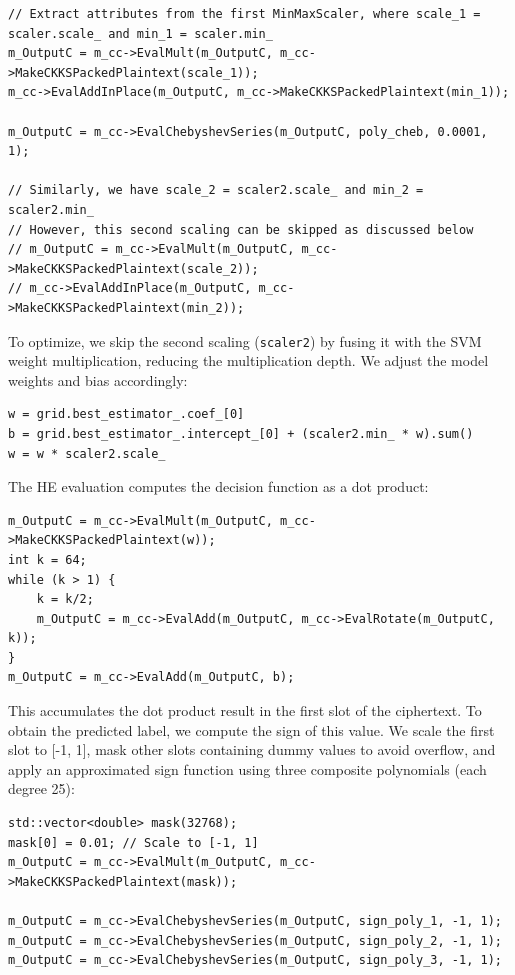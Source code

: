 \documentclass[article]{iacrtrans}
\begin{document}
\begin{lstlisting}
// Extract attributes from the first MinMaxScaler, where scale_1 = scaler.scale_ and min_1 = scaler.min_
m_OutputC = m_cc->EvalMult(m_OutputC, m_cc->MakeCKKSPackedPlaintext(scale_1));
m_cc->EvalAddInPlace(m_OutputC, m_cc->MakeCKKSPackedPlaintext(min_1));
    
m_OutputC = m_cc->EvalChebyshevSeries(m_OutputC, poly_cheb, 0.0001, 1);
    
// Similarly, we have scale_2 = scaler2.scale_ and min_2 = scaler2.min_
// However, this second scaling can be skipped as discussed below
// m_OutputC = m_cc->EvalMult(m_OutputC, m_cc->MakeCKKSPackedPlaintext(scale_2));
// m_cc->EvalAddInPlace(m_OutputC, m_cc->MakeCKKSPackedPlaintext(min_2));
\end{lstlisting}

To optimize, we skip the second scaling (\texttt{scaler2}) by fusing it with the SVM weight multiplication, reducing the multiplication depth. We adjust the model weights and bias accordingly:

\begin{lstlisting}
w = grid.best_estimator_.coef_[0]
b = grid.best_estimator_.intercept_[0] + (scaler2.min_ * w).sum()
w = w * scaler2.scale_
\end{lstlisting}

The HE evaluation computes the decision function as a dot product:

\begin{lstlisting}
m_OutputC = m_cc->EvalMult(m_OutputC, m_cc->MakeCKKSPackedPlaintext(w));
int k = 64;
while (k > 1) {
    k = k/2;
    m_OutputC = m_cc->EvalAdd(m_OutputC, m_cc->EvalRotate(m_OutputC, k));
}
m_OutputC = m_cc->EvalAdd(m_OutputC, b);
\end{lstlisting}

This accumulates the dot product result in the first slot of the ciphertext. To obtain the predicted label, we compute the sign of this value. We scale the first slot to [-1, 1], mask other slots containing dummy values to avoid overflow, and apply an approximated sign function using three composite polynomials (each degree 25):

\begin{lstlisting}
std::vector<double> mask(32768);
mask[0] = 0.01; // Scale to [-1, 1]
m_OutputC = m_cc->EvalMult(m_OutputC, m_cc->MakeCKKSPackedPlaintext(mask));
    
m_OutputC = m_cc->EvalChebyshevSeries(m_OutputC, sign_poly_1, -1, 1);
m_OutputC = m_cc->EvalChebyshevSeries(m_OutputC, sign_poly_2, -1, 1);
m_OutputC = m_cc->EvalChebyshevSeries(m_OutputC, sign_poly_3, -1, 1);
\end{lstlisting}
\end{document}
